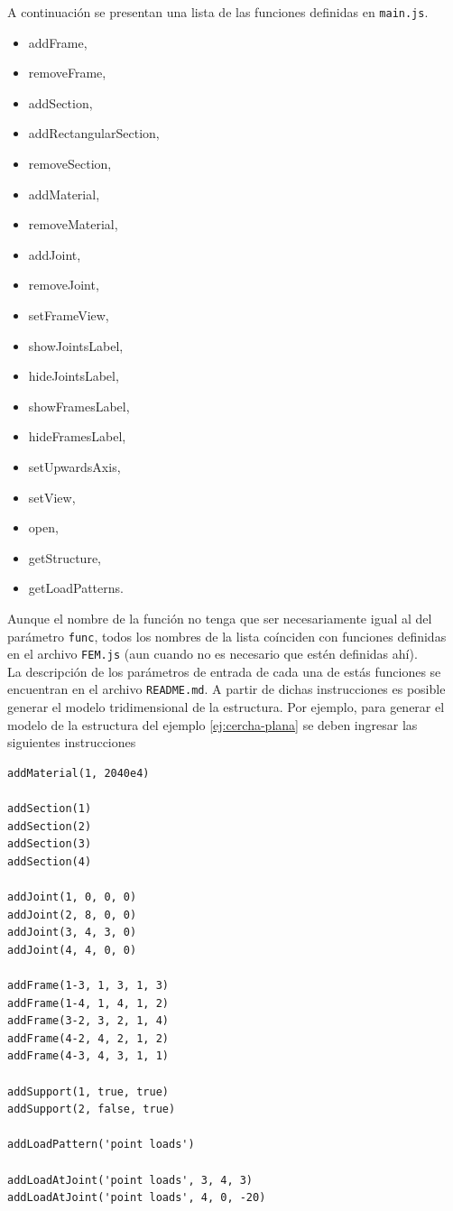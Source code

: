 A continuación se presentan una lista de las funciones definidas en \verb|main.js|.\\

\begin{multicols}{2}
  \setlength{\columnseprule}{0pt}
  \begin{itemize}
  \item addFrame,
  \item removeFrame,
  \item addSection,
  \item addRectangularSection,
  \item removeSection,
  \item addMaterial,
  \item removeMaterial,
  \item addJoint,
  \item removeJoint,
  \item setFrameView,
  \item showJointsLabel,
  \item hideJointsLabel,
  \item showFramesLabel,
  \item hideFramesLabel,
  \item setUpwardsAxis,
  \item setView,
  \item open,
  \item getStructure,
  \item getLoadPatterns.
  \end{itemize}
\end{multicols}

Aunque el nombre de la función no tenga que ser necesariamente igual al del parámetro \verb|func|, todos los nombres de la lista coínciden con funciones definidas en el archivo \verb|FEM.js| (aun cuando no es necesario que estén definidas ahí).\\

La descripción de los parámetros de entrada de cada una de estás funciones se encuentran en el archivo \verb|README.md|. A partir de dichas instrucciones es posible generar el modelo tridimensional de la estructura. Por ejemplo, para generar el modelo de la estructura del ejemplo \ref{ej:cercha-plana} se deben ingresar las siguientes instrucciones\\
\begin{lstlisting}[language={}, frame=single]
addMaterial(1, 2040e4)

addSection(1)
addSection(2)
addSection(3)
addSection(4)

addJoint(1, 0, 0, 0)
addJoint(2, 8, 0, 0)
addJoint(3, 4, 3, 0)
addJoint(4, 4, 0, 0)

addFrame(1-3, 1, 3, 1, 3)
addFrame(1-4, 1, 4, 1, 2)
addFrame(3-2, 3, 2, 1, 4)
addFrame(4-2, 4, 2, 1, 2)
addFrame(4-3, 4, 3, 1, 1)

addSupport(1, true, true)
addSupport(2, false, true)

addLoadPattern('point loads')

addLoadAtJoint('point loads', 3, 4, 3)
addLoadAtJoint('point loads', 4, 0, -20)
\end{lstlisting}

